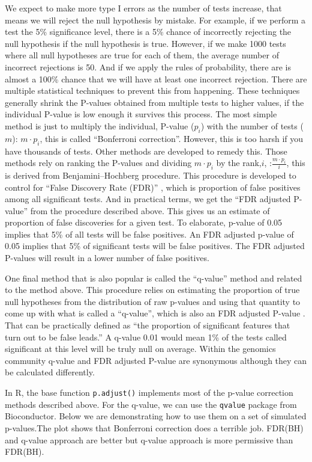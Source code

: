 \documentclass[12pt,]{krantz}
\theoremstyle{definition}
\theoremstyle{definition}
\theoremstyle{definition}
\theoremstyle{remark}
\begin{document}
We expect to make more type I errors as the number of tests increase,
that means we will reject the null hypothesis by mistake. For example,
if we perform a test the 5\% significance level, there is a 5\% chance
of incorrectly rejecting the null hypothesis if the null hypothesis is
true. However, if we make 1000 tests where all null hypotheses are true
for each of them, the average number of incorrect rejections is 50. And
if we apply the rules of probability, there are is almost a 100\% chance
that we will have at least one incorrect rejection. There are multiple
statistical techniques to prevent this from happening. These techniques
generally shrink the P-values obtained from multiple tests to higher
values, if the individual P-value is low enough it survives this
process. The most simple method is just to multiply the individual,
P-value (\(p_i\)) with the number of tests (\(m\)): \(m \cdot p_i\),
this is called ``Bonferroni correction''. However, this is too harsh if
you have thousands of tests. Other methods are developed to remedy this.
Those methods rely on ranking the P-values and dividing \(m \cdot p_i\)
by the rank,\(i\), :\(\frac{m \cdot p_i }{i}\), this is derived from
Benjamini--Hochberg procedure. This procedure is developed to control
for ``False Discovery Rate (FDR)'' , which is proportion of false
positives among all significant tests. And in practical terms, we get
the ``FDR adjusted P-value'' from the procedure described above. This
gives us an estimate of proportion of false discoveries for a given
test. To elaborate, p-value of 0.05 implies that 5\% of all tests will
be false positives. An FDR adjusted p-value of 0.05 implies that 5\% of
significant tests will be false positives. The FDR adjusted P-values
will result in a lower number of false positives.

One final method that is also popular is called the ``q-value'' method
and related to the method above. This procedure relies on estimating the
proportion of true null hypotheses from the distribution of raw p-values
and using that quantity to come up with what is called a ``q-value'',
which is also an FDR adjusted P-value . That can be practically defined
as ``the proportion of significant features that turn out to be false
leads.'' A q-value 0.01 would mean 1\% of the tests called significant
at this level will be truly null on average. Within the genomics
community q-value and FDR adjusted P-value are synonymous although they
can be calculated differently.

In R, the base function \texttt{p.adjust()} implements most of the
p-value correction methods described above. For the q-value, we can use
the \texttt{qvalue} package from Bioconductor. Below we are
demonstrating how to use them on a set of simulated p-values.The plot
shows that Bonferroni correction does a terrible job. FDR(BH) and
q-value approach are better but q-value approach is more permissive than
FDR(BH).
\end{document}
